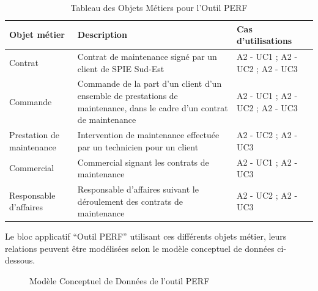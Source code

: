 \begin{table}[H]
    \begin{tabular}{p{3cm}|p{10cm}|p{3cm}}
    Objet métier & Description & Cas d'utilisations \\ \hline
    Contrat & Contrat de maintenance signé par un client de SPIE Sud-Est & A2 - UC1 ; A2 - UC2 ; A2 - UC3 \\ \hline
    Commande & Commande de la part d’un client d’un ensemble de prestations de maintenance, dans le cadre d’un contrat de maintenance & A2 - UC1 ; A2 - UC2 ; A2 - UC3 \\ \hline
    Prestation de maintenance & Intervention de maintenance effectuée par un technicien pour un client
 & A2 - UC2 ; A2 - UC3 \\ \hline
    Commercial & Commercial signant les contrats de maintenance & A2 - UC1 ; A2 - UC3 \\ \hline
    Responsable d’affaires & Responsable d’affaires suivant le déroulement des contrats de maintenance & A2 - UC2 ; A2 - UC3 \\ 
    \end{tabular}
    \caption{Tableau des Objets Métiers pour l'Outil PERF}
\end{table}

Le bloc applicatif “Outil PERF” utilisant ces différents objets métier, leurs relations peuvent être modélisées selon le modèle conceptuel de données ci-dessous.

\begin{figure}[H]
    \label{fig-om-perf}
    \noindent{}
    \caption{Modèle Conceptuel de Données de l'outil PERF}
\end{figure}


